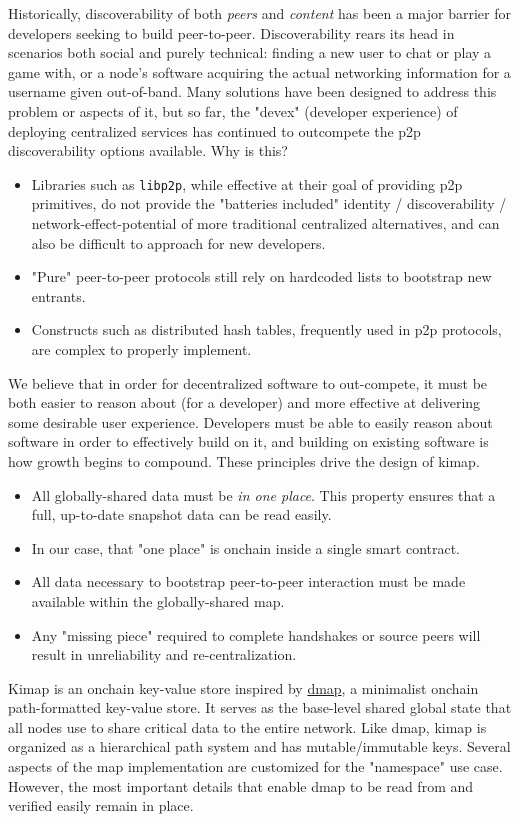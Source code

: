 \documentclass[runningheads]{llncs}
\begin{document}
Historically, discoverability of both \textit{peers} and \textit{content} has been a major barrier for developers seeking to build peer-to-peer.
Discoverability rears its head in scenarios both social and purely technical: finding a new user to chat or play a game with, or a node's software acquiring the actual networking information for a username given out-of-band.
Many solutions have been designed to address this problem or aspects of it, but so far, the "devex" (developer experience) of deploying centralized services has continued to outcompete the p2p discoverability options available.
Why is this?
\begin{itemize}
    \item Libraries such as \verb|libp2p|, while effective at their goal of providing p2p primitives, do not provide the "batteries included" identity / discoverability / network-effect-potential of more traditional centralized alternatives, and can also be difficult to approach for new developers.
    \item "Pure" peer-to-peer protocols still rely on hardcoded lists to bootstrap new entrants.
    \item Constructs such as distributed hash tables, frequently used in p2p protocols, are complex to properly implement.
\end{itemize}
We believe that in order for decentralized software to out-compete, it must be both easier to reason about (for a developer) and more effective at delivering some desirable user experience.
Developers must be able to easily reason about software in order to effectively build on it, and building on existing software is how growth begins to compound.
These principles drive the design of kimap.
\begin{itemize}
    \item All globally-shared data must be \textit{in one place}.
    This property ensures that a full, up-to-date snapshot data can be read easily.
    \item In our case, that "one place" is onchain inside a single smart contract.
    \item All data necessary to bootstrap peer-to-peer interaction must be made available within the globally-shared map.
    \item Any "missing piece" required to complete handshakes or source peers will result in unreliability and re-centralization.
\end{itemize}

Kimap is an onchain key-value store inspired by \href{https://github.com/dapphub/dmap}{dmap}, a minimalist onchain path-formatted key-value store.
It serves as the base-level shared global state that all nodes use to share critical data to the entire network.
Like dmap, kimap is organized as a hierarchical path system and has mutable/immutable keys.
Several aspects of the map implementation are customized for the "namespace" use case.
However, the most important details that enable dmap to be read from and verified easily remain in place.
\end{document}
